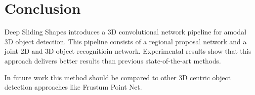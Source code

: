 \documentclass[12pt]{scrartcl}
\begin{document}


\section{Conclusion}

Deep Sliding Shapes introduces a 3D convolutional network pipeline for
amodal 3D object detection. This pipeline consists of a regional proposal
network and a joint 2D and 3D object recognitioin network. Experimental
results show that this approach delivers better results than previous
state-of-the-art methods.

In future work this method should be compared to other 3D centric object detection
approaches like Frustum Point Net\cite{Qi2017}.

\newpage
\printbibliography
{}%
\end{document}
